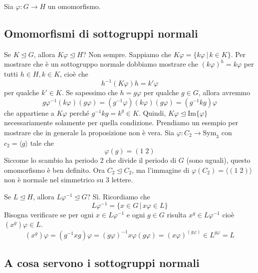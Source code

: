 \documentclass[a4paper]{article}
\begin{document}
Sia \(\varphi \colon G \to H\) un omomorfismo.

\subsection{Omomorfismi di sottogruppi normali}

Se \(K \unlhd G\), allora \(K\varphi \unlhd H\)? Non sempre.
Sappiamo che \(K\varphi = \{k\varphi \,|\, k\in K\}\).
Per mostrare che è un sottogruppo normale dobbiamo mostrare che
\({(k\varphi)}^h = k\varphi\) per tutti \(h \in H, k \in K\),
cioè che
\[
    h^{-1}(K\varphi)h = k'\varphi
\]
per qualche \(k' \in K\).
Se sapessimo che \(h = g\varphi\) per qualche \(g\in G\), allora avremmo
\[
    g\varphi^{-1}(k\varphi)(g\varphi) =
    (g^{-1} \varphi)(k\varphi)(g\varphi)
    = (g^{-1}kg)\varphi
\]
che appartiene a \(K\varphi\) perché \(g^{-1} k g = k^g \in K\).
Quindi, \(K\varphi \unlhd \text{Im}\{\varphi\}\) necessariamente solamente per quella condizione.
Prendiamo un esempio per mostrare che in generale la proposizione non è vera.
Sia \(\varphi \colon C_2 \to \text{Sym}_3\) con \(c_2 = \langle g \rangle\) tale che
\[
    \varphi(g) = (1\;2)
\]
Siccome lo scambio ha periodo \(2\) che divide il periodo di \(G\) (sono uguali),
questo omomorfismo è ben definito. Ora \(C_2 \unlhd C_2\), ma l'immagine di \(\varphi(C_2) = \langle (1\;2) \rangle\)
non è normale nel simmetrico su 3 lettere.

Se \(L \unlhd H\), allora \(L\varphi^{-1} \unlhd G\)? Sì.
Ricordiamo che
\[
    L\varphi^{-1} = \{x \in G \,|\, x\varphi\in L \}
\]
Bisogna verificare se per ogni \(x \in L\varphi^{-1}\)
e ogni \(g\in G\) risulta \(x^g \in L \varphi^{-1}\) cioè \((x^g)\varphi \in L\).
\[
    (x^g) \varphi = (g^{-1} x g) \varphi = {(g\varphi)}^{-1} x \varphi(g\varphi)
    = {(x\varphi)}^{(g\varphi)} \in L^{g\varphi} = L
\]


\subsection{A cosa servono i sottogruppi normali}
\end{document}
